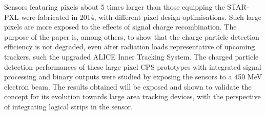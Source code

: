 Sensors featuring pixels about 5 times larger than those equipping the STAR-PXL were fabricated in 2014, with different pixel design optimisations. Such large pixels are more exposed to the effects of signal charge recombination. The purpose of the paper is, among others, to show that the charge particle detection efficiency is not degraded, even after radiation loads representative of upcoming trackers, such the upgraded ALICE Inner Tracking System. The charged particle detection performances of these large pixel CPS prototypes with integrated signal processing and binary outputs were studied by exposing the sensors to a 450 MeV electron beam. The results obtained will be exposed
and shown to validate the concept for its evolution towards large area tracking devices, with the perspective of integrating logical strips in the sensor.
